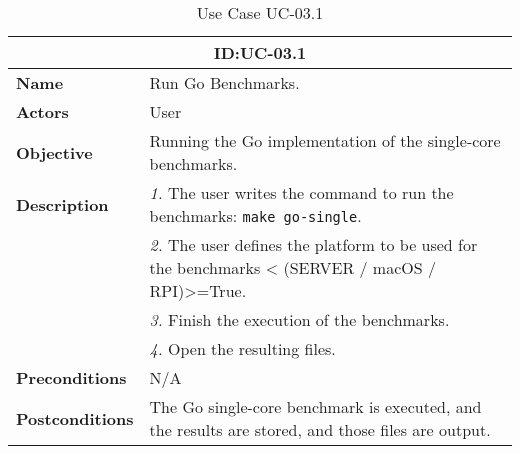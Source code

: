 \begin{table}[H]
    \centering
    \begin{tabular}{l p{10cm}}
        \toprule
        \multicolumn{2}{c}{\textbf{ID:\@ UC-03.1}} \\
        \toprule
        \textbf{Name}                         &  Run Go Benchmarks. \\
        \textbf{Actors}                       &  User \\
        \textbf{Objective}                    &  Running the Go implementation of the single-core benchmarks. \\
        \multirow{1}{*}{\textbf{Description}} & \textsl{1.} The user writes the command to run the benchmarks: \texttt{make go-single}.\\
                                              & \textsl{2.} The user defines the platform to be used for the benchmarks < (SERVER / macOS / RPI)>=True.\\
                                              & \textsl{3.} Finish the execution of the benchmarks.\\
                                              & \textsl{4.} Open the resulting files.\\
        \textbf{Preconditions}                &  N/A \\
        \textbf{Postconditions}               &  The Go single-core benchmark is executed, and the results are stored, and those files are output. \\
    \end{tabular}
    \caption{Use Case UC-03.1}\label{tab:uc-03.1}
\end{table}


